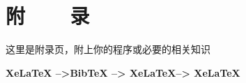 \chapter{附~~~~录}
这里是附录页，附上你的程序或必要的相关知识

{\bf\heiti\color{red}{若要生成目录和参考文献的编译方式:} \color{black}XeLaTeX -->BibTeX --> XeLaTeX--> XeLaTeX}


\clearpage